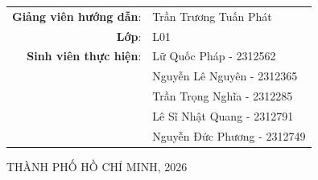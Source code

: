 \begin{titlepage}
\begin{table}[h]
\hspace*{2.0cm} 
\begin{tabular}{rl}
    \textbf{Giảng viên hướng dẫn}: & Trần Trương Tuấn Phát\\
    \textbf{Lớp}: & L01 \\
    \textbf{Sinh viên thực hiện}:
    & Lữ Quốc Pháp - 2312562 \\
    & Nguyễn Lê Nguyên - 2312365 \\
    & Trần Trọng Nghĩa - 2312285 \\
    & Lê Sĩ Nhật Quang - 2312791 \\
    & Nguyễn Đức Phương - 2312749 \\
\end{tabular}
\end{table}
\vfill
\begin{center}
{\footnotesize THÀNH PHỐ HỒ CHÍ MINH, 2026}
\end{center}
\end{titlepage}
